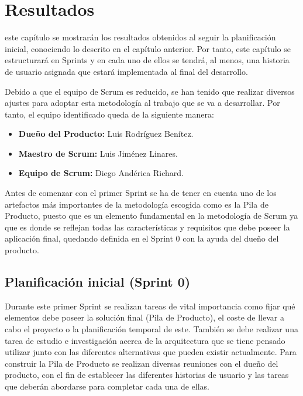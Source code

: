 \chapter{Resultados}
\label{chap:resultados}

 este capítulo se mostrarán los resultados obtenidos al seguir la planificación inicial, conociendo lo descrito en el capítulo anterior. Por tanto, este capítulo se estructurará en Sprints y en cada uno de ellos se tendrá, al menos, una historia de usuario asignada que estará implementada al final del desarrollo.

Debido a que el equipo de Scrum es reducido, se han tenido que realizar diversos ajustes para adoptar esta metodología al trabajo que se va a desarrollar. Por tanto, el equipo identificado queda de la siguiente manera:

\begin{itemize}
	\item \textbf{Dueño del Producto:} Luis Rodríguez Benítez.
	\item \textbf{Maestro de Scrum:} Luis Jiménez Linares.
	\item \textbf{Equipo de Scrum:} Diego Andérica Richard.
\end{itemize}

Antes de comenzar con el primer Sprint se ha de tener en cuenta uno de los artefactos más importantes de la metodología escogida como es la Pila de Producto, puesto que es un elemento fundamental en la metodología de Scrum ya que es donde se reflejan todas las características y requisitos que debe poseer la aplicación final, quedando definida en el Sprint 0 con la ayuda del dueño del producto.

\clearpage

\section{Planificación inicial (Sprint 0)}
Durante este primer Sprint se realizan tareas de vital importancia como fijar qué elementos debe poseer la solución final (Pila de Producto), el coste de llevar a cabo el proyecto o la planificación temporal de este. También se debe realizar una tarea de estudio e investigación acerca de la arquitectura que se tiene pensado utilizar junto con las diferentes alternativas que pueden existir actualmente. Para construir la Pila de Producto se realizan diversas reuniones con el dueño del producto, con el fin de establecer las diferentes historias de usuario y las tareas que deberán abordarse para completar cada una de ellas.

